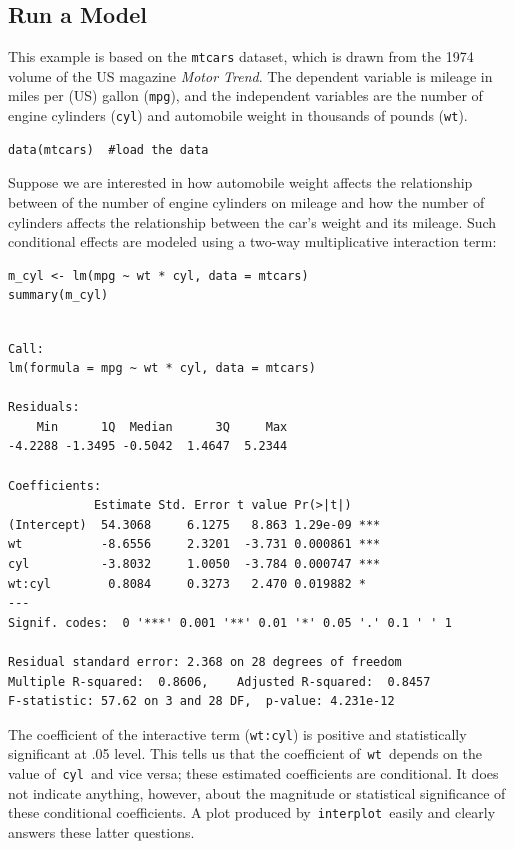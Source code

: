 \documentclass[
  article]{jss}
\begin{document}
\hypertarget{run-a-model}{%
\subsection{Run a Model}\label{run-a-model}}

This example is based on the \texttt{mtcars} dataset, which is drawn
from the 1974 volume of the US magazine \emph{Motor Trend}. The
dependent variable is mileage in miles per (US) gallon (\texttt{mpg}),
and the independent variables are the number of engine cylinders
(\texttt{cyl}) and automobile weight in thousands of pounds
(\texttt{wt}).

\begin{verbatim}
data(mtcars)  #load the data
\end{verbatim}

Suppose we are interested in how automobile weight affects the
relationship between of the number of engine cylinders on mileage and
how the number of cylinders affects the relationship between the car's
weight and its mileage. Such conditional effects are modeled using a
two-way multiplicative interaction term:

\begin{verbatim}
m_cyl <- lm(mpg ~ wt * cyl, data = mtcars)
summary(m_cyl)
\end{verbatim}

\begin{verbatim}

Call:
lm(formula = mpg ~ wt * cyl, data = mtcars)

Residuals:
    Min      1Q  Median      3Q     Max 
-4.2288 -1.3495 -0.5042  1.4647  5.2344 

Coefficients:
            Estimate Std. Error t value Pr(>|t|)    
(Intercept)  54.3068     6.1275   8.863 1.29e-09 ***
wt           -8.6556     2.3201  -3.731 0.000861 ***
cyl          -3.8032     1.0050  -3.784 0.000747 ***
wt:cyl        0.8084     0.3273   2.470 0.019882 *  
---
Signif. codes:  0 '***' 0.001 '**' 0.01 '*' 0.05 '.' 0.1 ' ' 1

Residual standard error: 2.368 on 28 degrees of freedom
Multiple R-squared:  0.8606,    Adjusted R-squared:  0.8457 
F-statistic: 57.62 on 3 and 28 DF,  p-value: 4.231e-12
\end{verbatim}

The coefficient of the interactive term (\texttt{wt:cyl}) is positive
and statistically significant at .05 level. This tells us that the
coefficient of~\texttt{wt}~depends on the value of~\texttt{cyl}~and vice
versa; these estimated coefficients are conditional. It does not
indicate anything, however, about the magnitude or statistical
significance of these conditional coefficients. A plot produced
by~\texttt{interplot}~easily and clearly answers these latter questions.
\end{document}

